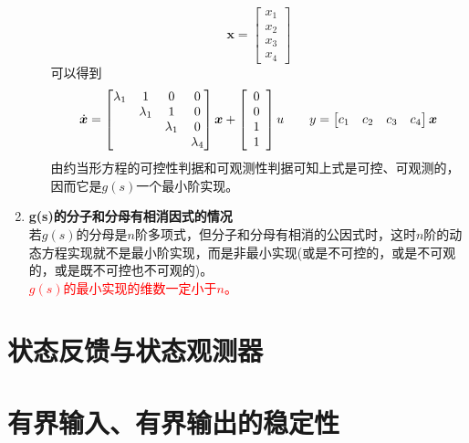 \begin{enumerate}[\hspace*{2em} (1)]
\begin{enumerate}[(a) ]
\begin{equation}
		\bm{x} = 
		\begin{bmatrix}
			x_1\\
			x_2\\
			x_3\\
			x_4
		\end{bmatrix}
	\end{equation}
	可以得到
	\begin{equation}
		\dot{\bm{x}} = 
		\begin{bmatrix}
			\lambda_1 & 1 & 0 & 0\\
			& \lambda_1 & 1 & 0\\
			& & \lambda_ 1 & 0\\
			&&& \lambda_4
		\end{bmatrix}
		\bm{x}
		+ 
		\begin{bmatrix}
			\hspace*{0.5em} 0 \hspace*{0.5em}\\
			0\\
			1\\
			1
		\end{bmatrix}
		u
		\qquad 
		y = 
		\begin{bmatrix}
			c_1 & c_2 & c_3 & c_4
		\end{bmatrix}
		\bm{x}
	\end{equation}
	\hspace*{2em} 由约当形方程的可控性判据和可观测性判据可知上式是可控、可观测的，因而它是$g(s)$一个最小阶实现。
	\end{enumerate}
	
	\item \textbf{g(s)的分子和分母有相消因式的情况}\\
	\hspace*{2em} 若$g(s)$的分母是$n$阶多项式，但分子和分母有相消的公因式时，这时$n$阶的动态方程实现就不是最小阶实现，而是非最小实现(或是不可控的，或是不可观的，或是既不可控也不可观的)。\\
	\hspace*{2em} \textcolor{red}{$g(s)$的最小实现的维数一定小于$n$。}
\end{enumerate}

\section{状态反馈与状态观测器}








\section{有界输入、有界输出的稳定性}















